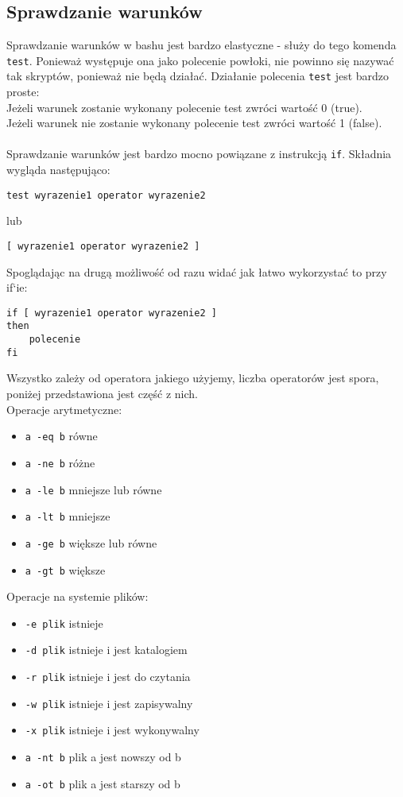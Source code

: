 \subsection{Sprawdzanie warunków}
Sprawdzanie warunków w bashu jest bardzo elastyczne - służy do tego komenda \texttt{test}. Ponieważ występuje ona jako polecenie powłoki, nie powinno się nazywać tak skryptów, ponieważ nie będą działać. Działanie polecenia \texttt{test} jest bardzo proste:\\
Jeżeli warunek zostanie wykonany polecenie test zwróci wartość 0 (true).\\
Jeżeli warunek nie zostanie wykonany polecenie test zwróci wartość 1 (false).\\\\
Sprawdzanie warunków jest bardzo mocno powiązane z instrukcją \texttt{if}. Składnia wygląda następująco:
\begin{lstlisting}
test wyrazenie1 operator wyrazenie2
\end{lstlisting}
lub
\begin{lstlisting}
[ wyrazenie1 operator wyrazenie2 ]
\end{lstlisting}
Spoglądając na drugą możliwość od razu widać jak łatwo wykorzystać to przy if`ie:
\begin{lstlisting}
if [ wyrazenie1 operator wyrazenie2 ]
then
	polecenie
fi
\end{lstlisting}
Wszystko zależy od operatora jakiego użyjemy, liczba operatorów jest spora, poniżej przedstawiona jest część z nich.\\
Operacje arytmetyczne:
\begin{itemize}[itemsep=0cm,leftmargin=1cm]
\item \texttt{a -eq b} równe
\item \texttt{a -ne b} różne
\item \texttt{a -le b} mniejsze lub równe
\item \texttt{a -lt b} mniejsze
\item \texttt{a -ge b} większe lub równe
\item \texttt{a -gt b} większe
\end{itemize}
Operacje na systemie plików:
\begin{itemize}[itemsep=0cm,leftmargin=1cm]
\item \texttt{-e plik} istnieje
\item \texttt{-d plik} istnieje i jest katalogiem
\item \texttt{-r plik} istnieje i jest do czytania
\item \texttt{-w plik} istnieje i jest zapisywalny
\item \texttt{-x plik} istnieje i jest wykonywalny
\item \texttt{a -nt b} plik a jest nowszy od b
\item \texttt{a -ot b} plik a jest starszy od b
\end{itemize}
